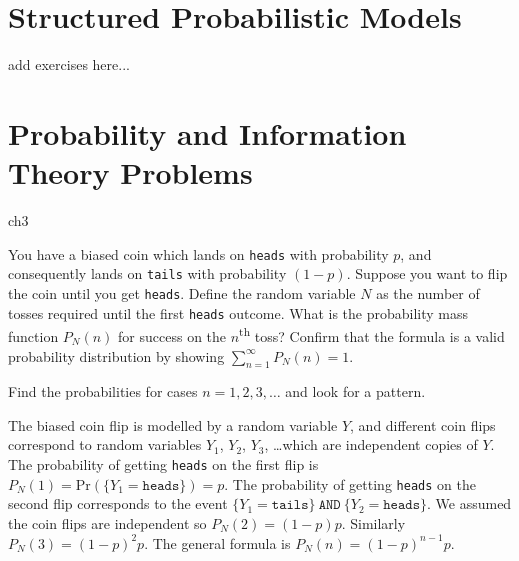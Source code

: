 \setcounter{section}{13}
\section{Structured Probabilistic Models}

add exercises here...





\setcounter{section}{14}
\section{Probability and Information Theory Problems}

\begin{problems}{ch3}


	\begin{problem}		\label{problem:geometric_distr_biased_coin_until_heads}
		You have a biased coin which lands on \texttt{heads} with probability $p$,
		and consequently lands on \texttt{tails} with probability $(1-p)$.
		Suppose you want to flip the coin until you get \texttt{heads}.
		Define the random variable $N$ as the number of tosses required until the first \texttt{heads} outcome.
		What is the probability mass function $P_N(n)$ for success on the $n$\textsuperscript{th} toss?
		Confirm that the formula is a valid probability distribution by showing $\sum_{n=1}^\infty P_N(n) = 1$.

		\begin{hint}
			Find the probabilities for cases $n=1,2,3,\ldots$ and look for a pattern.
		\end{hint}

		\begin{solution}
			The biased coin flip is modelled by a random variable $Y$,
			and different coin flips correspond to random variables $Y_1$, $Y_2$, $Y_3$, \ldots which are independent copies of $Y$.
			The probability of getting \texttt{heads} on the first flip is $P_N(1)=\textrm{Pr}\!\left( \{ Y_1=\texttt{heads} \} \right)\! =p$.
			The probability of getting \texttt{heads} on the second flip corresponds
			to the event $\{Y_1=\texttt{tails}\} \ \texttt{AND} \ \{Y_2=\texttt{heads} \}$.
			We assumed the coin flips are independent so %
			$P_N(2)=(1-p)p$.
			Similarly $P_N(3) = (1-p)^2p$.
			The general formula is $P_N(n) = (1-p)^{n-1}p$.
		\end{solution}
	\end{problem}


\end{problems}


